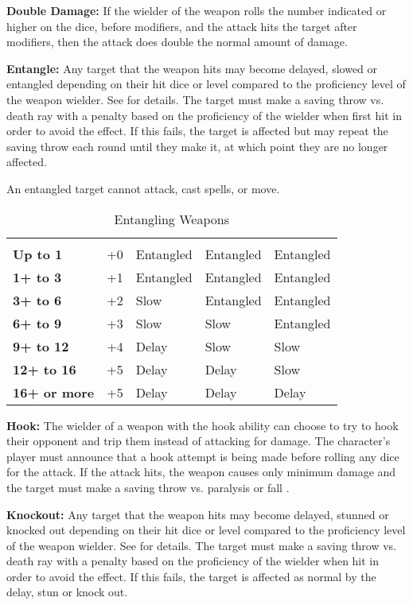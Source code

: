 \begin{multicols*}{2}
\textbf{Double Damage:} If the wielder of the weapon rolls the number indicated or higher on the dice, before modifiers, and the attack hits the target after modifiers, then the attack does double the normal amount of damage.

\textbf{Entangle:} Any target that the weapon hits may become delayed, slowed or entangled depending on their hit dice or level compared to the proficiency level of the weapon wielder. See  for details. The target must make a saving throw vs. death ray with a penalty based on the proficiency of the wielder when first hit in order to avoid the effect. If this fails, the target is affected but may repeat the saving throw each round until they make it, at which point they are no longer affected.

An entangled target cannot attack, cast spells, or move.

\begin {table}[H]
  \caption{Entangling Weapons}\label{tab:Entangling Weapons}
  \begin{tabularx}{\columnwidth}{>{\bfseries}M{.6in}YYYY}
		 &  &  &  & \\
		Up to 1 & +0 & Entangled & Entangled & Entangled\\
		1+ to 3 & +1 & Entangled & Entangled & Entangled\\
		3+ to 6 & +2 & Slow & Entangled & Entangled\\
		6+ to 9 & +3 & Slow & Slow & Entangled\\
		9+ to 12 & +4 & Delay & Slow & Slow\\
		12+ to 16 & +5 & Delay & Delay & Slow\\
		16+ or more & +5 & Delay & Delay & Delay\
  \end {tabularx}
\end {table}

\textbf{Hook:} The wielder of a weapon with the hook ability can choose to try to hook their opponent and trip them instead of attacking for damage. The character’s player must announce that a hook attempt is being made before rolling any dice for the attack. If the attack hits, the weapon causes only minimum damage and the target must make a saving throw vs. paralysis or fall .

\textbf{Knockout:} Any target that the weapon hits may become delayed, stunned or knocked out depending on their hit dice or level compared to the proficiency level of the weapon wielder. See  for details. The target must make a saving throw vs. death ray with a penalty based on the proficiency of the wielder when hit in order to avoid the effect. If this fails, the target is affected as normal by the delay, stun or knock out.


\end{multicols*}
